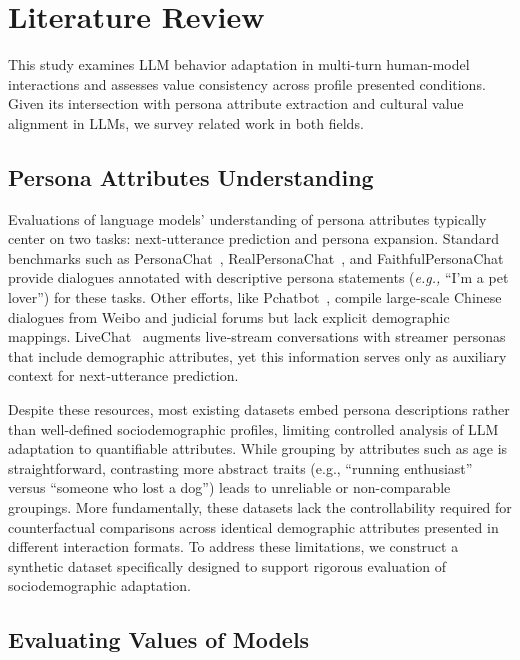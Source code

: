 \documentclass[11pt,a4paper]{article}
\newcommand{\eg}{\textit{e.g.,} \xspace}
\begin{document}
\section{Literature Review}
This study examines LLM behavior adaptation in multi-turn human-model interactions and assesses value consistency across profile presented conditions. Given its intersection with persona attribute extraction and cultural value alignment in LLMs, we survey related work in both fields.

\subsection{Persona Attributes Understanding}

Evaluations of language models' understanding of persona attributes typically center on two tasks: next‐utterance prediction and persona expansion. Standard benchmarks such as PersonaChat~\cite{personachat}, RealPersonaChat~\cite{realpersonachat}, and FaithfulPersonaChat~\cite{faithfulPersonaChat} provide dialogues annotated with descriptive persona statements (\eg “I’m a pet lover”) for these tasks. Other efforts, like Pchatbot~\cite{pchatbot}, compile large‐scale Chinese dialogues from Weibo and judicial forums but lack explicit demographic mappings. LiveChat~\cite{gao-etal-2023-livechat} augments live‐stream conversations with streamer personas that include demographic attributes, yet this information serves only as auxiliary context for next‐utterance prediction.


Despite these resources, most existing datasets embed persona descriptions rather than well-defined sociodemographic profiles, limiting controlled analysis of LLM adaptation to quantifiable attributes. While grouping by attributes such as age is straightforward, contrasting more abstract traits (e.g., ``running enthusiast'' versus ``someone who lost a dog'') leads to unreliable or non-comparable groupings. More fundamentally, these datasets lack the controllability required for counterfactual comparisons across identical demographic attributes presented in different interaction formats. To address these limitations, we construct a synthetic dataset specifically designed to support rigorous evaluation of sociodemographic adaptation.



\subsection{Evaluating Values of Models }
\end{document}
